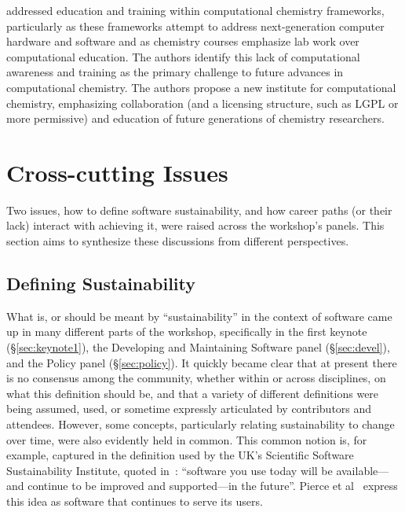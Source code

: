 \documentclass[11pt, oneside]{amsart}
\newcommand{\todo}[1]{{\color{blue}$\blacksquare$~\textsf{[TODO: #1]}}}
\newcommand{\note}[1]{ {\textcolor{red}    { #1 }}}
\begin{document}
\cite{Crawford_WSSSPE} addressed education and training within
computational chemistry frameworks, particularly as these frameworks
attempt to address next-generation computer hardware and software and
as chemistry courses emphasize lab work over computational education.
The authors identify this lack of computational awareness and training
as the primary challenge to future advances in computational
chemistry.  The authors propose a new institute for computational
chemistry, emphasizing collaboration (and a licensing structure, such
as LGPL or more permissive) and education of future generations of
chemistry researchers.

%
%
%

\section{Cross-cutting Issues} \label{sec:cross-cutting}

Two issues, how to define software sustainability, and how career
paths (or their lack) interact with achieving it, were raised across
the workshop's panels.  This section aims to synthesize these
discussions from different perspectives.

\subsection{Defining Sustainability}  \label{sec:defining-sustainability}%

What is, or should be meant by ``sustainability'' in the context of
software came up in many different parts of the workshop, specifically
in the first keynote (\S\ref{sec:keynote1}), the Developing and
Maintaining Software panel (\S\ref{sec:devel}), and the Policy panel
(\S\ref{sec:policy}). It quickly became clear that at present there is
no consensus among the community, whether within or across
disciplines, on what this definition should be, and that a variety of
different definitions were being assumed, used, or sometime expressly
articulated by contributors and attendees. However, some concepts,
particularly relating sustainability to change over time, were also
evidently held in common. This common notion is, for example, captured
in the definition used by the UK's Scientific Software Sustainability
Institute, quoted in~\cite{Venters_WSSSPE}: ``software you use today
will be available---and continue to be improved and supported---in the
future''. Pierce et al~\cite{Pierce_WSSSPE} express this idea as
software that continues to serve its users.
\end{document}
